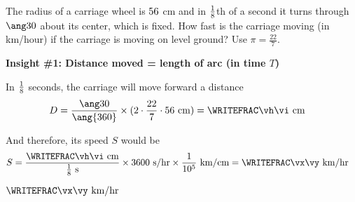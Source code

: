 

\FRACTIONSIMPLIFY{}\vd\ve
\FRACMULT\vd{}\vf\vg
\FRACMULT\vf\vg{}\vh\vi
\FRACDIV\vh{}\vb\vv\vw
\FRACMULT\vv{}\vx\vy


\question[2] The radius of a carriage wheel is $56$ cm and in $\frac{1}{8}$th of 
a second it turns through $\ang\vc$ about its center, which is fixed. How fast is the 
carriage moving (in km/hour) if the carriage is moving on level ground? Use $\pi=\frac{22}{7}$.

\watchout

\begin{solution}[\mcq]
  \textbf{Insight \#1: Distance moved = length of arc (in time $T$)} 

  In $\frac{1}{8}$ seconds, the carriage will move forward a distance 
  \begin{align}
    D &= \dfrac{\ang\vc}{\ang{360}}\times(2\cdot\dfrac{22}{7}\cdot\va\text{ cm}) = \WRITEFRAC\vh\vi\text{ cm}
  \end{align} 

  And therefore, its speed $S$ would be 
  \begin{align}
    S &= \dfrac{\WRITEFRAC\vh\vi\text{ cm}}{\frac{1}\vb\text{ s}}\times 3600\text{ s/hr}\times\dfrac{1}{10^5}\text{ km/cm}
       = \WRITEFRAC\vx\vy\text{ km/hr}
  \end{align}
\end{solution}
\ifprintanswers\begin{codex}$\WRITEFRAC\vx\vy\text{ km/hr}$\end{codex}\fi
